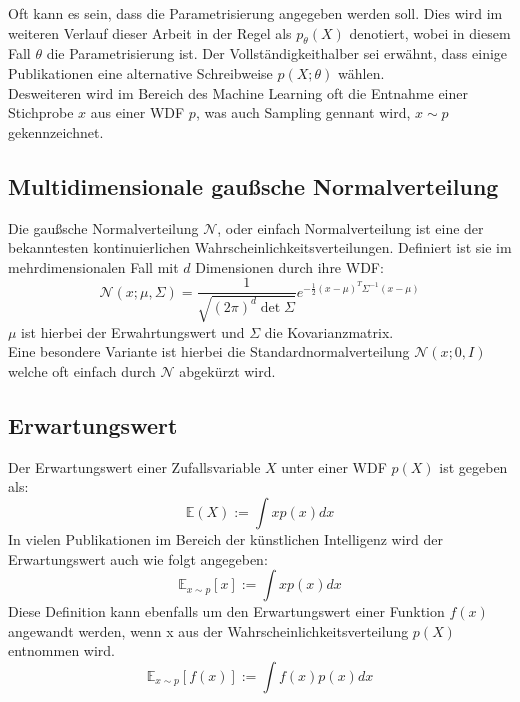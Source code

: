 Oft kann es sein, dass die Parametrisierung angegeben werden soll. Dies wird im weiteren Verlauf dieser Arbeit in der Regel als $p_\theta(X)$ denotiert, wobei in diesem Fall $\theta$ die Parametrisierung ist. Der Vollständigkeithalber sei erwähnt, dass einige Publikationen eine alternative Schreibweise $p(X; \theta)$ wählen. \\
Desweiteren wird im Bereich des Machine Learning oft die Entnahme einer Stichprobe $x$ aus einer WDF $p$, was auch Sampling gennant wird, $x \sim p$ gekennzeichnet. 


\subsection{Multidimensionale gaußsche Normalverteilung}

Die gaußsche Normalverteilung $\mathcal N$, oder einfach Normalverteilung ist eine der bekanntesten kontinuierlichen Wahrscheinlichkeitsverteilungen. Definiert ist sie im mehrdimensionalen Fall mit $d$ Dimensionen durch ihre WDF:
\begin{equation}
    \mathcal N(x; \mu, \Sigma) = 
    \frac{1}{\sqrt{(2\pi)^d \det{\Sigma}}}
    e^{-\frac{1}{2}(x-\mu)^T \Sigma^{-1} (x-\mu)}
\end{equation}
$\mu$ ist hierbei der Erwahrtungswert und $\Sigma$ die Kovarianzmatrix. \\
Eine besondere Variante ist hierbei die Standardnormalverteilung $\mathcal N(x; 0, I)$ welche oft einfach durch $\mathcal N$ abgekürzt wird.

\subsection{Erwartungswert}

Der Erwartungswert einer Zufallsvariable $X$ unter einer WDF $p(X)$ ist gegeben als: 
\begin{equation}
    \mathbb E(X) := \int x p(x) dx
\end{equation}
In vielen Publikationen im Bereich der künstlichen Intelligenz wird der Erwartungswert auch wie folgt angegeben:
\begin{equation}
    \mathbb E_{x \sim p}[x] := \int x p(x) dx
\end{equation}
Diese Definition kann ebenfalls um den Erwartungswert einer Funktion $f(x)$ angewandt werden, wenn x aus der Wahrscheinlichkeitsverteilung $p(X)$ entnommen wird. 
\begin{equation}
    \mathbb E_{x \sim p}[f(x)] := \int f(x) p(x) dx
\end{equation}

